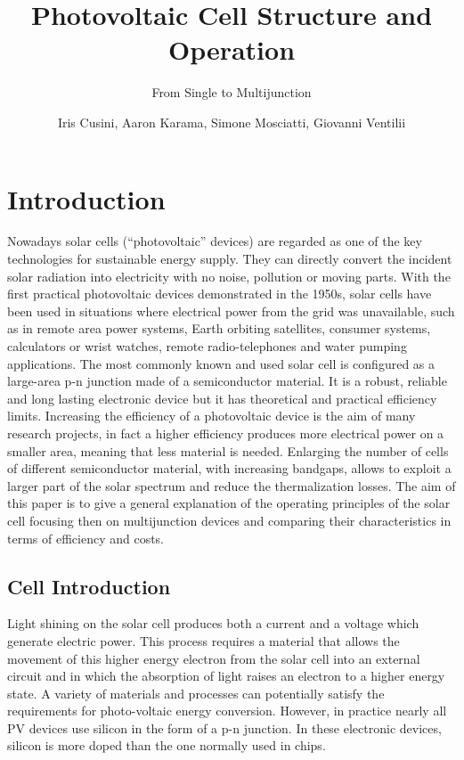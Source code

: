 \documentclass[11pt]{article} %
\title{Photovoltaic Cell Structure and Operation}
\subtitle{From Single to Multijunction}
\author{Iris Cusini, Aaron Karama, Simone Mosciatti, Giovanni Ventilii}
\begin{document}
\maketitle

\section{Introduction}

Nowadays solar cells (``photovoltaic'' devices) are regarded as one of the key technologies for sustainable energy supply. They can directly convert the incident solar radiation into electricity with no noise, pollution or moving parts. With the first practical photovoltaic devices demonstrated in the 1950s, solar cells have been used in situations where electrical power from the grid was unavailable, such as in remote area power systems, Earth orbiting satellites, consumer systems, calculators or wrist watches, remote radio-telephones and water pumping applications. The most commonly known and used solar cell is configured as a large-area p-n junction made of a semiconductor material. It is a robust, reliable and long lasting electronic device but it has theoretical and practical efficiency limits. Increasing the efficiency of a photovoltaic device is the aim of  many  research  projects, in fact a higher efficiency produces more electrical power on a smaller area, meaning that less material is needed. Enlarging the number of cells of different semiconductor material, with increasing bandgaps, allows to exploit a larger part of the solar spectrum and reduce the thermalization losses. The aim of this paper is to give a general explanation of the operating principles of the solar cell focusing then on multijunction devices and comparing their characteristics in terms of efficiency and costs.

\subsection{Cell Introduction}

Light shining on the solar cell produces both a current and a voltage which generate electric power. This process requires a material that allows the movement of this higher energy electron from the solar cell into an external circuit and in which  the absorption of light raises an electron to a higher energy state. A variety of materials and processes can potentially satisfy the requirements for photo-voltaic energy conversion. However, in practice nearly all PV devices use silicon in the form of a p-n junction. In these electronic devices, silicon is more doped than the one normally used in chips.
\end{document}
